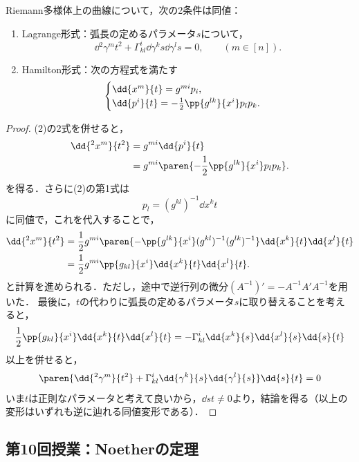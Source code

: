 \documentclass[uplatex,dvipdfmx]{jsarticle}
\begin{document}
\begin{exercise}[測地流の方程式のHamilton系としての特徴付け]
    Riemann多様体上の曲線について，次の2条件は同値：
    \begin{enumerate}
        \item Lagrange形式：弧長の定めるパラメータ$s$について，
        \[\dd{^2\gamma^m}{t^2}+\Gamma_{kl}^i\dd{\gamma^k}{s}\dd{\gamma^l}{s}=0,\qquad(m\in[n]).\]
        \item Hamilton形式：次の方程式を満たす
        \[\begin{cases}
            \dd{x^m}{t}=g^{mi}p_i,\\
            \dd{p^i}{t}=-\frac{1}{2}\pp{g^{lk}}{x^i}p_lp_k.
        \end{cases}\]
    \end{enumerate}
\end{exercise}
\begin{proof}
    (2)の2式を併せると，
    \begin{align*}
        \dd{^2x^m}{t^2}&=g^{mi}\dd{p^i}{t}\\
        &=g^{mi}\paren{-\frac{1}{2}\pp{g^{lk}}{x^i}p_lp_k}.
    \end{align*}
    を得る．さらに(2)の第1式は
    \[p_l=(g^{kl})^{-1}\dd{x^k}{t}\]
    に同値で，これを代入することで，
    \begin{align*}
        \dd{^2x^m}{t^2}&=\frac{1}{2}g^{mi}\paren{-\pp{g^{lk}}{x^i}(g^{kl})^{-1}(g^{lk})^{-1}}\dd{x^k}{t}\dd{x^l}{t}\\
        &=\frac{1}{2}g^{mi}\pp{g_{kl}}{x^i}\dd{x^k}{t}\dd{x^l}{t}.
    \end{align*}
    と計算を進められる．ただし，途中で逆行列の微分$(A^{-1})'=-A^{-1}A'A^{-1}$を用いた．
    最後に，$t$の代わりに弧長の定めるパラメータ$s$に取り替えることを考えると，
    \[\frac{1}{2}\pp{g_{kl}}{x^i}\dd{x^k}{t}\dd{x^l}{t}=-\Gamma^{i}_{kl}\dd{x^k}{s}\dd{x^l}{s}\dd{s}{t}\]
    以上を併せると，
    \[\paren{\dd{^2\gamma^m}{t^2}+\Gamma_{kl}^i\dd{\gamma^k}{s}\dd{\gamma^l}{s}}\dd{s}{t}=0\]
    いま$t$は正則なパラメータと考えて良いから，$\dd{s}{t}\ne0$より，結論を得る（以上の変形はいずれも逆に辿れる同値変形である）．
\end{proof}

\subsection{第10回授業：Noetherの定理}
\end{document}
